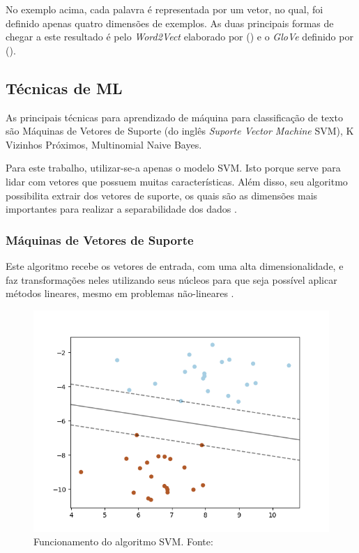 No exemplo acima, cada palavra é representada por um vetor, no qual, foi definido apenas quatro dimensões de exemplos. As duas principais formas de chegar a este resultado é pelo \textit{Word2Vect} elaborado por \citeauthor{MIKOLOV2013a} (\citeyear{MIKOLOV2013a}) e o \textit{GloVe} definido por \citeauthor{PENNINGTON2014} (\citeyear{PENNINGTON2014}).

\subsection{Técnicas de ML}

As principais técnicas para aprendizado de máquina para classificação de texto são Máquinas de Vetores de Suporte (do inglês \textit{Suporte Vector Machine} SVM), K Vizinhos Próximos, Multinomial Naive Bayes.

Para este trabalho, utilizar-se-a apenas o modelo SVM. Isto porque serve para lidar com vetores que possuem muitas características. Além disso, seu algoritmo possibilita extrair dos vetores de suporte, os quais são as dimensões mais importantes para realizar a separabilidade dos dados \cite{HEARST1995}.

\subsubsection{Máquinas de Vetores de Suporte}

Este algoritmo recebe os vetores de entrada, com uma alta dimensionalidade, e faz transformações neles utilizando seus núcleos para que seja possível aplicar métodos lineares, mesmo em problemas não-lineares \cite{HEARST1995}.

\begin{figure}[h]
	\centering
    \includegraphics[keepaspectratio=true,scale=0.7]{figuras/svmExample}
	\caption[SVM Funcionamento]{Funcionamento do algoritmo SVM. Fonte: \cite[Acesso em 10 de Junho de 2018.]{PEDREGOSA2011}}
	\label{fig:svmExample}
\end{figure}

